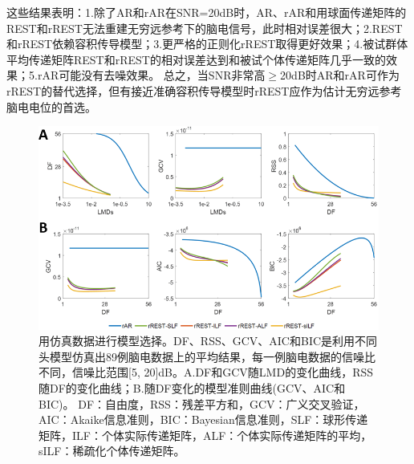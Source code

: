 这些结果表明：1.除了AR和rAR在SNR=20dB时，AR、rAR和用球面传递矩阵的REST和rREST无法重建无穷远参考下的脑电信号，此时相对误差很大；2.REST和rREST依赖容积传导模型；3.更严格的正则化rREST取得更好效果；4.被试群体平均传递矩阵REST和rREST的相对误差达到和被试个体传递矩阵几乎一致的效果；5.rAR可能没有去噪效果。 总之，当SNR非常高$\geq$20dB时AR和rAR可作为rREST的替代选择，但有接近准确容积传导模型时rREST应作为估计无穷远参考脑电电位的首选。
\begin{figure}[!h]
	\centering
	\includegraphics[width=15cm]{pic/Frontier/figure5.png}
	\caption{用仿真数据进行模型选择。DF、RSS、GCV、AIC和BIC是利用不同头模型仿真出89例脑电数据上的平均结果，每一例脑电数据的信噪比不同，信噪比范围[5, 20]dB。A.DF和GCV随LMD的变化曲线，RSS随DF的变化曲线；B.随DF变化的模型准则曲线(GCV、AIC和BIC)。 DF：自由度，RSS：残差平方和，GCV：广义交叉验证，AIC：Akaike信息准则，BIC：Bayesian信息准则，SLF：球形传递矩阵，ILF：个体实际传递矩阵，ALF：个体实际传递矩阵的平均，sILF：稀疏化个体传递矩阵。}
	\label{3:5}
\end{figure}

